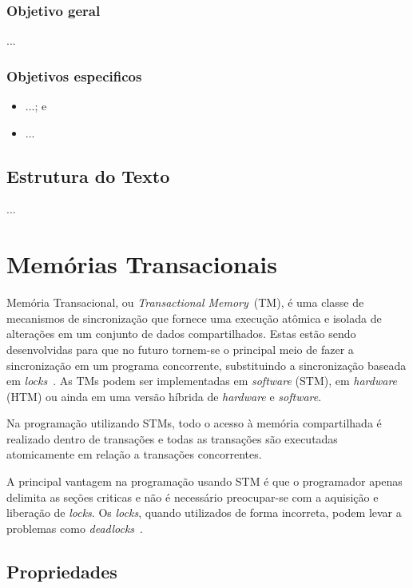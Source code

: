 \documentclass[diss,capa]{texufpel}
\begin{document}
\subsection{Objetivo geral}

...

\subsection{Objetivos especificos}

\begin{itemize}

  \item ...; e
  \item ...
\end{itemize}

\section{Estrutura do Texto}

...

\chapter{Memórias Transacionais}
\label{chapter::stm}

Memória Transacional, ou \emph{Transactional Memory}~(TM), é uma classe de mecanismos de sincronização que fornece uma execução atômica e isolada de alterações em um conjunto de dados compartilhados. Estas estão sendo desenvolvidas para que no futuro tornem-se o principal meio de fazer a sincronização em um programa concorrente, substituindo a sincronização baseada em \emph{locks}~\cite{energyawaretm}. As TMs podem ser implementadas em \emph{software} (STM), em \emph{hardware} (HTM) ou ainda em uma versão híbrida de \emph{hardware} e \emph{software}.

Na programação utilizando STMs, todo o acesso à memória compartilhada é realizado dentro de transações e todas as transações são executadas atomicamente em relação a transações concorrentes.

A principal vantagem na programação usando STM é que o programador apenas delimita as seções criticas e não é necessário preocupar-se com a aquisição e liberação de \emph{locks}. Os \emph{locks}, quando utilizados de forma incorreta, podem levar a problemas como \emph{deadlocks}~\cite{BAND10}.

\section{Propriedades}
\end{document}
